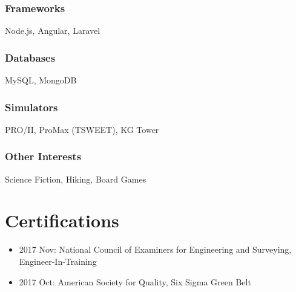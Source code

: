 \documentclass[12pt]{res} %
\begin{document}
\begin{resume}
\begin{multicols}{3}
            \subsubsection{Frameworks}
            \vspace{-22pt}
            Node.js, Angular, Laravel
            \vspace{-28pt}

            \subsubsection{Databases}
            \vspace{-22pt}
            MySQL, MongoDB
            \vspace{-28pt}

            \subsubsection{Simulators}
            \vspace{-22pt}
            PRO/II, ProMax (TSWEET), KG Tower
            \vspace{-28pt}

            \subsubsection{Other Interests}
            \vspace{-22pt}
            Science Fiction, Hiking, Board Games

            \vspace{-12pt}

        \end{multicols}

        \vspace{-24pt}

            \section{Certifications} 
            \begin{itemize}
            \setlength{\itemindent}{-0.65in}
            \itemsep0em
            \item 2017 Nov: National Council of Examiners for Engineering and Surveying, Engineer-In-Training
            \item 2017 Oct: American Society for Quality, Six Sigma Green Belt
            \end{itemize}
            \vspace{-12pt}

    \end{resume}

\vspace*{\fill}
\end{document}
